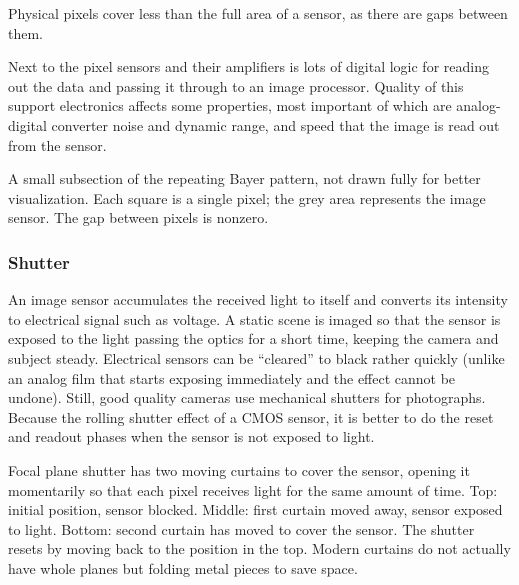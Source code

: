 
Physical pixels cover less than the full area of a sensor, as there are gaps between them.


Next to the pixel sensors and their amplifiers is lots of digital logic for reading out the data and passing it through to an image processor.
Quality of this support electronics affects some properties, most important of which are analog-digital converter noise and dynamic range, and speed that the image is read out from the sensor.


{A small subsection of the repeating Bayer pattern, not drawn fully for better visualization. Each square is a single pixel; the grey area represents the image sensor. The gap between pixels is nonzero.}



\subsubsection{Shutter} %


An image sensor accumulates the received light to itself and converts its intensity to electrical signal such as voltage.
A static scene is imaged so that the sensor is exposed to the light passing the optics for a short time, keeping the camera and subject steady.
Electrical sensors can be ``cleared'' to black rather quickly (unlike an analog film that starts exposing immediately and the effect cannot be undone). Still, good quality cameras use mechanical shutters for photographs.
Because the rolling shutter effect of a CMOS sensor, it is better to do the reset and readout phases when the sensor is not exposed to light.


{Focal plane shutter has two moving curtains to cover the sensor, opening it momentarily so that each pixel receives light for the same amount of time.
Top: initial position, sensor blocked.
Middle: first curtain moved away, sensor exposed to light.
Bottom: second curtain has moved to cover the sensor.
The shutter resets by moving back to the position in the top.
Modern curtains do not actually have whole planes but folding metal pieces to save space.}


